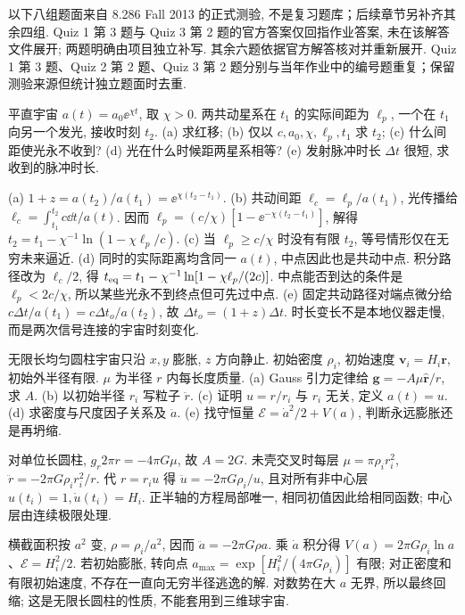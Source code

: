 以下八组题面来自 8.286 Fall 2013 的正式测验, 不是复习题库；后续章节另补齐其余四组. Quiz 1 第 3 题与 Quiz 3 第 2 题的官方答案仅回指作业答案, 未在该解答文件展开; 两题明确由项目独立补写. 其余六题依据官方解答核对并重新展开. Quiz 1 第 3 题、Quiz 2 第 2 题、Quiz 3 第 2 题分别与当年作业中的编号题重复；保留测验来源但统计独立题面时去重.

\begin{exercise}
平直宇宙 $a(t)=a_0\ee^{\chi t}$, 取 $\chi>0$. 两共动星系在 $t_1$ 的实际间距为 $\ell_p$, 一个在 $t_1$ 向另一个发光, 接收时刻 $t_2$.
(a) 求红移; (b) 仅以 $c,a_0,\chi,\ell_p,t_1$ 求 $t_2$; (c) 什么间距使光永不收到?
(d) 光在什么时候距两星系相等?
(e) 发射脉冲时长 $\Delta t$ 很短, 求收到的脉冲时长.
\end{exercise}
\begin{solution}
(a) $1+z=a(t_2)/a(t_1)=\ee^{\chi(t_2-t_1)}$.
(b) 共动间距 $\ell_c=\ell_p/a(t_1)$, 光传播给 $\ell_c=\int_{t_1}^{t_2}c\dd t/a(t)$. 因而 $\ell_p=(c/\chi)[1-\ee^{-\chi(t_2-t_1)}]$, 解得 $t_2=t_1-\chi^{-1}\ln(1-\chi\ell_p/c)$.
(c) 当 $\ell_p\ge c/\chi$ 时没有有限 $t_2$, 等号情形仅在无穷未来逼近.
(d) 同时的实际距离均含同一 $a(t)$, 中点因此也是共动中点. 积分路径改为 $\ell_c/2$, 得 $t_{\rm eq}=t_1-\chi^{-1}\ln[1-\chi\ell_p/(2c)]$. 中点能否到达的条件是 $\ell_p<2c/\chi$, 所以某些光永不到终点但可先过中点.
(e) 固定共动路径对端点微分给 $c\Delta t/a(t_1)=c\Delta t_o/a(t_2)$, 故 $\Delta t_o=(1+z)\Delta t$. 时长变长不是本地仪器走慢, 而是两次信号连接的宇宙时刻变化.
\end{solution}

\begin{exercise}
无限长均匀圆柱宇宙只沿 $x,y$ 膨胀, $z$ 方向静止. 初始密度 $\rho_i$, 初始速度 $\boldsymbol v_i=H_i\boldsymbol r$, 初始外半径有限. $\mu$ 为半径 $r$ 内每长度质量.
(a) Gauss 引力定律给 $\boldsymbol g=-A\mu\hat{\boldsymbol r}/r$, 求 $A$.
(b) 以初始半径 $r_i$ 写粒子 $\ddot r$.
(c) 证明 $u=r/r_i$ 与 $r_i$ 无关, 定义 $a(t)=u$.
(d) 求密度与尺度因子关系及 $\ddot a$.
(e) 找守恒量 $\mathcal E=\dot a^2/2+V(a)$, 判断永远膨胀还是再坍缩.
\end{exercise}
\begin{solution}
对单位长圆柱, $g_r2\pi r=-4\pi G\mu$, 故 $A=2G$. 未壳交叉时每层 $\mu=\pi\rho_ir_i^2$, $\ddot r=-2\pi G\rho_ir_i^2/r$. 代 $r=r_iu$ 得 $\ddot u=-2\pi G\rho_i/u$, 且对所有非中心层 $u(t_i)=1,\dot u(t_i)=H_i$. 正半轴的方程局部唯一, 相同初值因此给相同函数; 中心层由连续极限处理.

横截面积按 $a^2$ 变, $\rho=\rho_i/a^2$, 因而 $\ddot a=-2\pi G\rho a$. 乘 $\dot a$ 积分得 $V(a)=2\pi G\rho_i\ln a$、$\mathcal E=H_i^2/2$. 若初始膨胀, 转向点 $a_{\max}=\exp[H_i^2/(4\pi G\rho_i)]$ 有限; 对正密度和有限初始速度, 不存在一直向无穷半径逃逸的解. 对数势在大 $a$ 无界, 所以最终回缩; 这是无限长圆柱的性质, 不能套用到三维球宇宙.
\end{solution}

